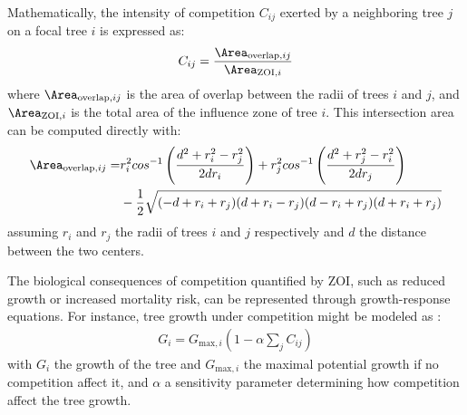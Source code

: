 
Mathematically, the intensity of competition $C_{ij}$ exerted by a neighboring tree $j$ on a focal tree $i$ is expressed as:
\begin{align}
    C_{ij} = \frac{ \Area_{\text{overlap}, ij} }{ \Area_{\text{ZOI}, i} }
\end{align}
where $\Area_{\text{overlap}, ij}$ is the area of overlap between the radii of trees $i$ and $j$, and $\Area_{\text{ZOI}, i}$ is the total area of the influence zone of tree $i$. This intersection area can be computed directly with:
\begin{align}
    \Area_{\text{overlap}, ij} = &r_i^2 cos^{-1}\left( \frac{d^2 + r_i^2 - r_j^2}{2 d r_i} \right) + r_j^2 cos^{-1} \left(\frac{d^2 + r_j^2 - r_i^2}{2 d r_j} \right) \nonumber \\
    & - \frac{1}{2} \sqrt{(-d + r_i + r_j)(d + r_i - r_j)(d - r_i + r_j)(d + r_i + r_j)}
\end{align}
assuming $r_i$ and $r_j$ the radii of trees $i$ and $j$ respectively and $d$ the distance between the two centers.

The biological consequences of competition quantified by ZOI, such as reduced growth or increased mortality risk, can be represented through growth-response equations. For instance, tree growth under competition might be modeled as \cite{Das2012,Uriarte2004}:
\begin{align}
    G_i = G_{\text{max}, i} \left(1 - \alpha \sum_{j} {C_{ij}} \right)
\end{align}
with $G_i$ the growth of the tree and $G_{\text{max}, i}$ the maximal potential growth if no competition affect it, and $\alpha$ a sensitivity parameter determining how competition affect the tree growth.


